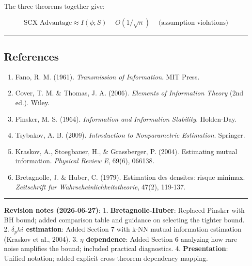 \documentclass[
  12pt,
]{ctexart}
\providecommand{\tightlist}{%
  \setlength{\itemsep}{0pt}\setlength{\parskip}{0pt}}
\begin{document}
The three theorems together give:

\[\text{SCX Advantage} \approx I(\phi; S) - O(1/\sqrt{n}) - \text{(assumption violations)}\]

\begin{center}\rule{0.5\linewidth}{0.5pt}\end{center}

\subsection{References}\label{references}

\begin{enumerate}
\def\labelenumi{\arabic{enumi}.}
\tightlist
\item
  Fano, R. M. (1961). \emph{Transmission of Information}. MIT Press.
\item
  Cover, T. M. \& Thomas, J. A. (2006). \emph{Elements of Information
  Theory} (2nd ed.). Wiley.
\item
  Pinsker, M. S. (1964). \emph{Information and Information Stability}.
  Holden-Day.
\item
  Tsybakov, A. B. (2009). \emph{Introduction to Nonparametric
  Estimation}. Springer.
\item
  Kraskov, A., Stoegbauer, H., \& Grassberger, P. (2004). Estimating
  mutual information. \emph{Physical Review E}, 69(6), 066138.
\item
  Bretagnolle, J. \& Huber, C. (1979). Estimation des densites: risque
  minimax. \emph{Zeitschrift fur Wahrscheinlichkeitstheorie}, 47(2),
  119-137.
\end{enumerate}

\begin{center}\rule{0.5\linewidth}{0.5pt}\end{center}

\textbf{Revision notes (2026-06-27)}: 1. \textbf{Bretagnolle-Huber}:
Replaced Pinsker with BH bound; added comparison table and guidance on
selecting the tighter bound. 2. \textbf{\(\delta_phi\) estimation}:
Added Section 7 with k-NN mutual information estimation (Kraskov et al.,
2004). 3. \textbf{\(\eta\) dependence}: Added Section 6 analyzing how
rare noise amplifies the bound; included practical diagnostics. 4.
\textbf{Presentation}: Unified notation; added explicit cross-theorem
dependency mapping.
\end{document}
